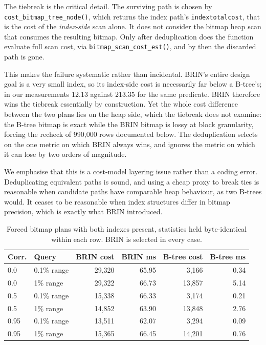 \documentclass[preprint,12pt,authoryear]{elsarticle}
\begin{document}
The tiebreak is the critical detail. The surviving path is chosen by
\texttt{cost\_bitmap\_tree\_node()}, which returns the index path's
\texttt{indextotalcost}, that is the cost of the \emph{index-side} scan
alone. It does not consider the bitmap heap scan that consumes the
resulting bitmap. Only after deduplication does the function evaluate
full scan cost, via \texttt{bitmap\_scan\_cost\_est()}, and by then the
discarded path is gone.

This makes the failure systematic rather than incidental. BRIN's entire
design goal is a very small index, so its index-side cost is
necessarily far below a B-tree's; in our measurements 12.13 against
213.35 for the same predicate. BRIN therefore wins the tiebreak
essentially by construction. Yet the whole cost difference between the
two plans lies on the heap side, which the tiebreak does not examine:
the B-tree bitmap is exact while the BRIN bitmap is lossy at block
granularity, forcing the recheck of 990{,}000 rows documented below.
The deduplication selects on the one metric on which BRIN always wins,
and ignores the metric on which it can lose by two orders of magnitude.

We emphasise that this is a cost-model layering issue rather than a
coding error. Deduplicating equivalent paths is sound, and using a
cheap proxy to break ties is reasonable when candidate paths have
comparable heap behaviour, as two B-trees would. It ceases to be
reasonable when index structures differ in bitmap precision, which is
exactly what BRIN introduced.

\begin{table}[htbp]
\centering
\caption{Forced bitmap plans with both indexes present, statistics held
byte-identical within each row. BRIN is selected in every case.}
\label{tab:suppression}
\small
\begin{tabular}{@{}llrrrr@{}}
\toprule
Corr. & Query & BRIN cost & BRIN ms & B-tree cost & B-tree ms \\
\midrule
0.0 & 0.1\% range & 29{,}320 & 65.95 & 3{,}166 & 0.34 \\
0.0 & 1\% range & 29{,}322 & 66.73 & 13{,}857 & 5.14 \\
0.5 & 0.1\% range & 15{,}338 & 66.33 & 3{,}174 & 0.21 \\
0.5 & 1\% range & 14{,}852 & 63.90 & 13{,}848 & 2.76 \\
0.95 & 0.1\% range & 13{,}511 & 62.07 & 3{,}294 & 0.09 \\
0.95 & 1\% range & 15{,}365 & 66.45 & 14{,}201 & 0.76 \\
\bottomrule
\end{tabular}
\end{table}
\end{document}
